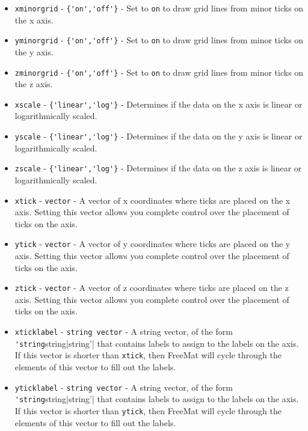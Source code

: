 \begin{itemize}
\item  \verb|xminorgrid| - \verb|{'on','off'}| - Set to \verb|on| to draw grid lines from minor ticks on
 the x axis.

\item  \verb|yminorgrid| - \verb|{'on','off'}| - Set to \verb|on| to draw grid lines from minor ticks on
 the y axis.

\item  \verb|zminorgrid| - \verb|{'on','off'}| - Set to \verb|on| to draw grid lines from minor ticks on
 the z axis.

\item  \verb|xscale| - \verb|{'linear','log'}| - Determines if the data on the x axis is linear or
 logarithmically scaled.

\item  \verb|yscale| - \verb|{'linear','log'}| - Determines if the data on the y axis is linear or
 logarithmically scaled.

\item  \verb|zscale| - \verb|{'linear','log'}| - Determines if the data on the z axis is linear or
 logarithmically scaled.

\item  \verb|xtick| - \verb|vector| - A vector of x coordinates where ticks are placed on the 
 x axis.  Setting this vector allows you complete control over the placement of ticks on 
 the axis.

\item  \verb|ytick| - \verb|vector| - A vector of y coordinates where ticks are placed on the 
 y axis.  Setting this vector allows you complete control over the placement of ticks on 
 the axis.

\item  \verb|ztick| - \verb|vector| - A vector of z coordinates where ticks are placed on the 
 z axis.  Setting this vector allows you complete control over the placement of ticks on 
 the axis.

\item  \verb|xticklabel| - \verb|string vector| - A string vector, of the form \verb|'string|string|string'|
 that contains labels to assign to the labels on the axis.  If this vector is shorter than
 \verb|xtick|, then FreeMat will cycle through the elements of this vector to fill out the labels.

\item  \verb|yticklabel| - \verb|string vector| - A string vector, of the form \verb|'string|string|string'|
 that contains labels to assign to the labels on the axis.  If this vector is shorter than
 \verb|ytick|, then FreeMat will cycle through the elements of this vector to fill out the labels.


\end{itemize}
